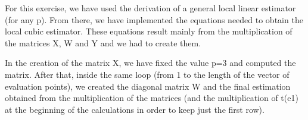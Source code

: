 \documentclass[
]{article}
\newenvironment{Shaded}{\begin{snugshade}}{\end{snugshade}}
\newcommand{\AttributeTok}[1]{\textcolor[rgb]{0.77,0.63,0.00}{#1}}
\newcommand{\ControlFlowTok}[1]{\textcolor[rgb]{0.13,0.29,0.53}{\textbf{#1}}}
\newcommand{\DecValTok}[1]{\textcolor[rgb]{0.00,0.00,0.81}{#1}}
\newcommand{\FunctionTok}[1]{\textcolor[rgb]{0.00,0.00,0.00}{#1}}
\newcommand{\NormalTok}[1]{#1}
\newcommand{\OtherTok}[1]{\textcolor[rgb]{0.56,0.35,0.01}{#1}}
\newcommand{\SpecialCharTok}[1]{\textcolor[rgb]{0.00,0.00,0.00}{#1}}
\begin{document}
For this exercise, we have used the derivation of a general local linear
estimator (for any p). From there, we have implemented the equations
needed to obtain the local cubic estimator. These equations result
mainly from the multiplication of the matrices X, W and Y and we had to
create them.

In the creation of the matrix X, we have fixed the value p=3 and
computed the matrix. After that, inside the same loop (from 1 to the
length of the vector of evaluation points), we created the diagonal
matrix W and the final estimation obtained from the multiplication of
the matrices (and the multiplication of t(e1) at the beginning of the
calculations in order to keep just the first row).

\begin{Shaded}
\end{Shaded}
\end{document}
